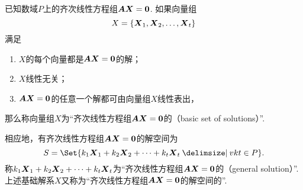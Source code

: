 \begin{definition}\label{definition:线性方程组.齐次线性方程组的基础解系}
已知数域\(P\)上的齐次线性方程组\(\A\x=\z\).
如果向量组\[
X=\{\x_1,\x_2,\dotsc,\x_t\}
\]满足
\begin{enumerate}
\item \(X\)的每个向量都是\(\A\x=\z\)的解；
\item \(X\)线性无关；
\item \(\A\x=\z\)的任意一个解都可由向量组\(X\)线性表出，%
\end{enumerate}
那么称向量组\(X\)为“齐次线性方程组\(\A\x=\z\)的（basic set of solutions）”.

\def\tongjie{ k_1\x_1+k_2\x_2+ \dotsb +k_t\x_t }
相应地，有齐次线性方程组\(\A\x=\z\)的解空间为\[
S = \Set{ \tongjie \given \v{k}{t} \in P }.
\]称\(\tongjie\)为“齐次线性方程组\(\A\x=\z\)的（general solution）”.
上述基础解系\(X\)又称为“齐次线性方程组\(\A\x=\z\)的解空间的”.
\end{definition}

